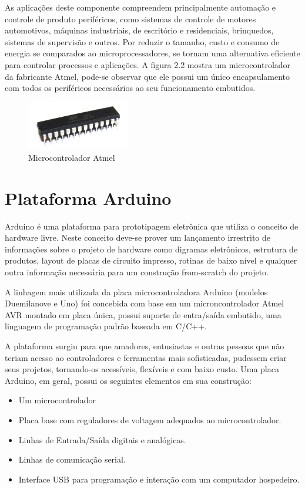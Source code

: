 As aplicações deste componente compreendem principalmente automação e controle de produto periféricos, como sistemas de controle de motores automotivos, máquinas industriais, de escritório e residenciais, brinquedos, sistemas de supervisão e outros. Por reduzir o tamanho, custo e consumo de energia se comparados ao microprocessadores, se tornam uma alternativa eficiente para controlar processos e aplicações. A figura 2.2 mostra um microcontrolador da fabricante Atmel, pode-se observar que ele possui um único encapsulamento com todos os periféricos necessários ao seu funcionamento embutidos.


\begin{figure}[h!]
			\centering
			\includegraphics[width=0.4\textwidth]{figures/microcont_atm.jpg}
			\caption{Microcontrolador Atmel}
			\label{1}
	\end{figure}


\section{Plataforma Arduino}

Arduino é uma plataforma para prototipagem eletrônica que utiliza o conceito de hardware livre. Neste conceito deve-se prover um lançamento irrestrito de informações sobre o projeto de hardware como digramas eletrônicos, estrutura de produtos, layout de placas de circuito impresso, rotinas de baixo nível e qualquer outra informação necessária para um construção from-scratch do projeto.

A linhagem mais utilizada da placa microcontroladora Arduino (modelos Duemilanove e Uno) foi concebida com base em um microncontrolador Atmel AVR montado em placa única, possui suporte de entra/saída embutido, uma linguagem de programação padrão baseada em C/C++.

A plataforma surgiu para que amadores, entusiastas e outras pessoas que não teriam acesso ao controladores e ferramentas mais sofisticadas, pudessem criar seus projetos, tornando-os acessíveis, flexíveis e com baixo custo. Uma placa Arduino, em geral, possui os seguintes elementos em sua construção:

\begin{itemize}
	\item Um microcontrolador
	\item Placa base com reguladores de voltagem adequados ao microcontrolador.
	\item Linhas de Entrada/Saída digitais e analógicas.
	\item Linhas de comunicação serial.
	\item Interface USB para programação e interação com um computador hospedeiro.
\end{itemize} 

